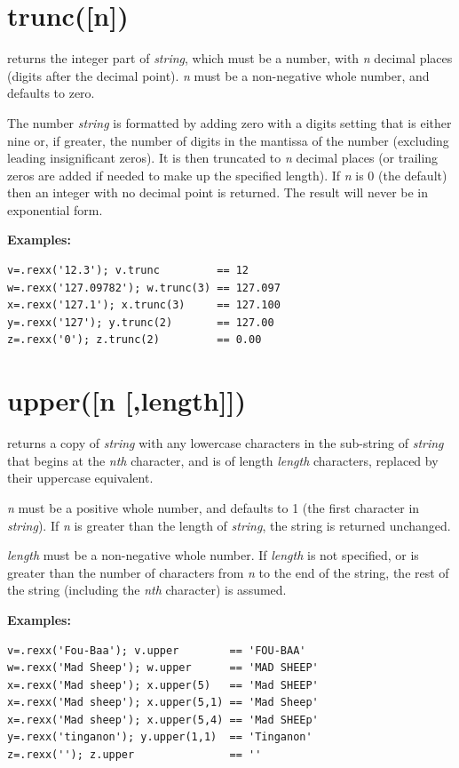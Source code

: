 \section{trunc([n{]})}\label{reftrunc}
returns the integer part of \emph{string}, which must be a
number, with \emph{n} decimal places (digits after the decimal
point).
\emph{n} must be a non-negative whole number, and defaults to zero.
 
The number \emph{string} is formatted by adding zero with a digits
setting that is either nine or, if greater, the number of digits in the
mantissa of the number (excluding leading insignificant zeros).
It is then truncated to \emph{n} decimal places (or trailing zeros
are added if needed to make up the specified length).
If \emph{n} is 0 (the default) then an integer with no decimal
point is returned.
The result will never be in exponential form.
 
\textbf{Examples:}
\begin{lstlisting}
v=.rexx('12.3'); v.trunc         == 12
w=.rexx('127.09782'); w.trunc(3) == 127.097
x=.rexx('127.1'); x.trunc(3)     == 127.100
y=.rexx('127'); y.trunc(2)       == 127.00
z=.rexx('0'); z.trunc(2)         == 0.00
\end{lstlisting}

\section{upper([n [,length{]]})}\label{refupper}
returns a copy of \emph{string} with any lowercase characters in
the sub-string of \emph{string} that begins at the \emph{n}\emph{th}
character, and is of length \emph{length} characters, replaced by
their uppercase equivalent.
 
\emph{n} must be a positive whole number, and defaults to 1 (the
first character in \emph{string}).  If \emph{n} is greater than
the length of \emph{string}, the string is returned unchanged.
 
\emph{length} must be a non-negative whole number.
If \emph{length} is not specified, or is greater than the number of
characters from \emph{n} to the end of the string, the rest of the
string (including the \emph{n}\emph{th} character) is assumed.
 
\textbf{Examples:}
\begin{lstlisting}
v=.rexx('Fou-Baa'); v.upper        == 'FOU-BAA'
w=.rexx('Mad Sheep'); w.upper      == 'MAD SHEEP'
x=.rexx('Mad sheep'); x.upper(5)   == 'Mad SHEEP'
x=.rexx('Mad sheep'); x.upper(5,1) == 'Mad Sheep'
x=.rexx('Mad sheep'); x.upper(5,4) == 'Mad SHEEp'
y=.rexx('tinganon'); y.upper(1,1)  == 'Tinganon'
z=.rexx(''); z.upper               == ''
\end{lstlisting}

